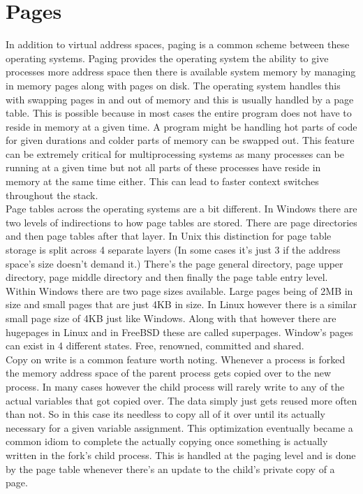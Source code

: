 \documentclass[letterpaper,10pt,draftclsnofoot,onecolumn]{IEEEtran}
\begin{document}
\section{Pages}
In addition to virtual address spaces, paging is a common scheme between these operating systems. Paging provides the operating system the ability to give processes more address space then there is available system memory by managing in memory pages along with pages on disk. The operating system handles this with swapping pages in and out of memory and this is usually handled by a page table. This is possible because in most cases the entire program does not have to reside in memory at a given time. A program might be handling hot parts of code for given durations and colder parts of memory can be swapped out. This feature can be extremely critical for multiprocessing systems as many processes can be running at a given time but not all parts of these processes have reside in memory at the same time either. This can lead to faster context switches throughout the stack.\\
Page tables across the operating systems are a bit different. In Windows there are two levels of indirections to how page tables are stored. There are page directories and then page tables after that layer. In Unix this distinction for page table storage is split across 4 separate layers (In some cases it's just 3 if the address space’s size doesn’t demand it.) There's the page general directory, page upper directory, page middle directory and then finally the page table entry level. Within Windows there are two page sizes available. Large pages being of 2MB in size and small pages that are just 4KB in size. In Linux however there is a similar small page size of 4KB just like Windows. Along with that however there are hugepages in Linux and in FreeBSD these are called superpages. \cite{mccusick} Window’s pages can exist in 4 different states. Free, renowned, committed and shared.\\
Copy on write is a common feature worth noting. Whenever a process is forked the memory address space of the parent process gets copied over to the new process. In many cases however the child process will rarely write to any of the actual variables that got copied over. The data simply just gets reused more often than not. So in this case its needless to copy all of it over until its actually necessary for a given variable assignment. This optimization eventually became a common idiom to complete the actually copying once something is actually written in the fork’s child process. This is handled at the paging level and is done by the page table whenever there’s an update to the child’s private copy of a page. \cite{love}\\
\end{document}
